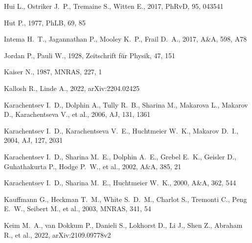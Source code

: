 \documentclass[fleqn,usenatbib]{mnras}
\begin{document}
\begin{thebibliography}{}
 Hui L., Ostriker J.~P., Tremaine S., Witten E., 2017, PhRvD, 95, 043541

 Hut P., 1977, PhLB, 69, 85


 Intema H.~T., Jagannathan P., Mooley K.~P., Frail D.~A., 2017, A\&A, 598, A78

 Jordan P., Pauli W., 1928, Zeitschrift für Physik, 47, 151

 Kaiser N., 1987, MNRAS, 227, 1

 Kallosh R., Linde A., 2022, arXiv:2204.02425


 Karachentsev I.~D., Dolphin A., Tully R.~B., Sharina M., Makarova L., Makarov D., Karachentseva V., et al., 2006, AJ, 131, 1361

 Karachentsev I.~D., Karachentseva V.~E., Huchtmeier W.~K., Makarov D.~I., 2004, AJ, 127, 2031

 Karachentsev I.~D., Sharina M.~E., Dolphin A.~E., Grebel E.~K., Geisler D., Guhathakurta P., Hodge P.~W., et al., 2002, A\&A, 385, 21

 Karachentsev I.~D., Sharina M.~E., Huchtmeier W.~K., 2000, A\&A, 362, 544

 Kauffmann G., Heckman T.~M., White S.~D.~M., Charlot S., Tremonti C., Peng E.~W., Seibert M., et al., 2003, MNRAS, 341, 54

 Keim M.~A., van Dokkum P., Danieli S., Lokhorst D., Li J., Shen Z., Abraham R., et al., 2022,  arXiv:2109.09778v2 


\end{thebibliography}
\end{document}
